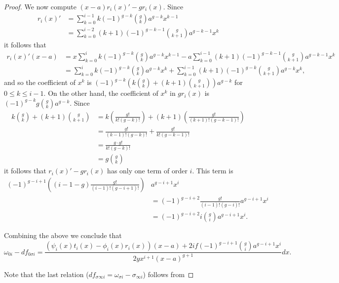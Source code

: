 \documentclass[draft, 11pt]{article} %
\theoremstyle{plain}
\theoremstyle{remark}
\begin{document}
\begin{proof}
We now compute $(x-a)r_i(x)'-gr_i(x)$.
Since 
\begin{align*}
r_i(x)' & = \sum_{k=0}^{i-1} k (-1)^{g-k} \binom{g}{k} a^{g-k} x^{k-1} \\
& = \sum_{k=0}^{i-2} (k+1) (-1)^{g-k-1} \binom{g}{k+1}a^{g-k-1} x^k
\end{align*}
it follows that
\begin{align*}
r_i(x)'(x-a) & = x \sum_{k=0}^i k (-1)^{g-k} \binom{g}{k} a^{g-k} x^{k-1} - a \sum_{k=0}^{i-1} (k+1) (-1)^{g-k-1} \binom{g}{k+1}a^{g-k-1} x^k \\
& = \sum_{k=0}^i k (-1)^{g-k} \binom{g}{k} a^{g-k} x^k  + \sum_{k=0}^{i-1} (k+1) (-1)^{g-k} \binom{g}{k+1}a^{g-k} x^k,
\end{align*}
and so the coefficient of $x^k$ is $(-1)^{g-k}\left(k\binom{g}{k} + (k+1)\binom{g}{k+1}\right) a^{g-k}$ for $0 \leq k \leq i-1$.
On the other hand, the coefficient of $x^k$ in $gr_i(x)$ is $(-1)^{g-k}g\binom{g}{k}a^{g-k}$.
Since 
\begin{align*}
k\binom{g}{k} + (k+1)\binom{g}{k+1} & = k \left( \frac{g!}{k!(g-k)!} \right) + (k+1) \left( \frac{g!}{(k+1)!(g-k-1)!} \right) \\
& = \frac{g!}{(k-1)!(g-k)!} + \frac{g!}{k!(g-k-1)!} \\
& = \frac{g\cdot g!}{k!(g-k)!} \\
& = g \binom{g}{k}
\end{align*}
it follows that $r_i(x)'-gr_i(x)$ has only one term of order $i$.
This term is
\begin{align*}
 (-1)^{g-i+1}\left( (i-1-g)\frac{g!}{(i-1)!(g-i+1)!} \right) & a^{g-i+1}x^i \\
&  = (-1)^{g-i+2} \frac{g!}{(i-1)!(g-i)!} a^{g-i+1}x^i \\
& = (-1)^{g-i+2}i\binom{g}{i} a^{g-i+1}x^i.
\end{align*}

Combining the above we conclude that
\[
\omega_{0 i } - df_{0\sigma i} =  \frac{(\psi_i(x)t_i(x) - \phi_i(x)r_i(x))(x-a) + 2if(-1)^{g-i+1}\binom{g}{i} a^{g-i+1}x^i}{2yx^{i+1}(x-a)^{g+1}}dx.
\]

Note that the last relation ($df_{\sigma \infty i} = \omega_{\sigma i} - \sigma_{\infty i}$) follows from 

\end{proof}
\end{document}
